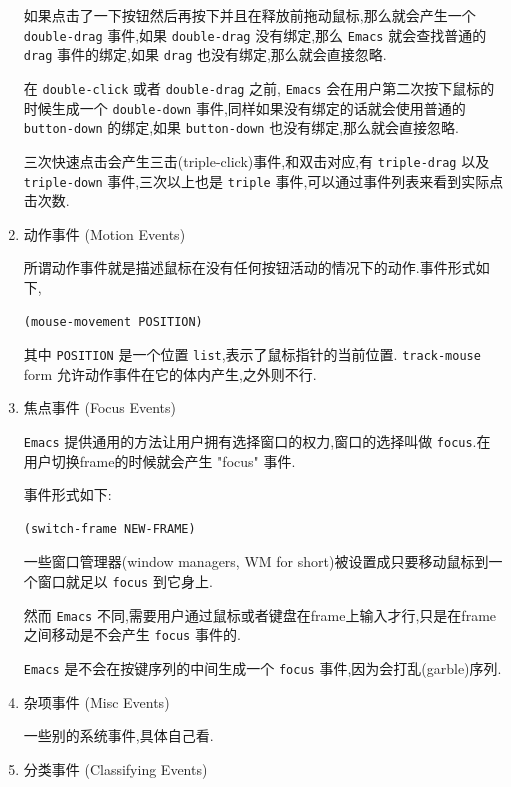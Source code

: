 \documentclass[11pt]{article}
\begin{document}
\begin{enumerate}
如果点击了一下按钮然后再按下并且在释放前拖动鼠标,那么就会产生一个 \texttt{double-drag} 事件,如果 \texttt{double-drag} 没有绑定,那么 \texttt{Emacs} 就会查找普通的 \texttt{drag} 事件的绑定,如果 \texttt{drag} 也没有绑定,那么就会直接忽略.

在 \texttt{double-click} 或者 \texttt{double-drag} 之前, \texttt{Emacs} 会在用户第二次按下鼠标的时候生成一个 \texttt{double-down} 事件,同样如果没有绑定的话就会使用普通的 \texttt{button-down} 的绑定,如果 \texttt{button-down} 也没有绑定,那么就会直接忽略.

三次快速点击会产生三击(triple-click)事件,和双击对应,有 \texttt{triple-drag} 以及 \texttt{triple-down} 事件,三次以上也是 \texttt{triple} 事件,可以通过事件列表来看到实际点击次数.


\item 动作事件 (Motion Events)
\label{sec:org0335fb1}

所谓动作事件就是描述鼠标在没有任何按钮活动的情况下的动作.事件形式如下,

\begin{verbatim}
(mouse-movement POSITION)
\end{verbatim}

其中 \texttt{POSITION} 是一个位置 \texttt{list},表示了鼠标指针的当前位置. \texttt{track-mouse} form 允许动作事件在它的体内产生,之外则不行.


\item 焦点事件 (Focus Events)
\label{sec:org407d1fe}

\texttt{Emacs} 提供通用的方法让用户拥有选择窗口的权力,窗口的选择叫做 \texttt{focus}.在用户切换frame的时候就会产生 "focus" 事件.

事件形式如下:

\begin{verbatim}
(switch-frame NEW-FRAME)
\end{verbatim}

一些窗口管理器(window managers, WM for short)被设置成只要移动鼠标到一个窗口就足以 \texttt{focus} 到它身上.

然而 \texttt{Emacs} 不同,需要用户通过鼠标或者键盘在frame上输入才行,只是在frame之间移动是不会产生 \texttt{focus} 事件的.

\texttt{Emacs} 是不会在按键序列的中间生成一个 \texttt{focus} 事件,因为会打乱(garble)序列.


\item 杂项事件 (Misc Events)
\label{sec:org90b07f8}

一些别的系统事件,具体自己看.


\item 分类事件 (Classifying Events)
\label{sec:org6a8a4a9}


\end{enumerate}
\end{document}

